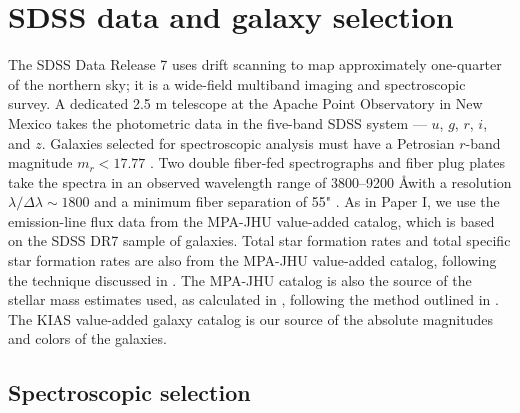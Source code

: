 %
%
\section[Data]{SDSS data and galaxy selection}

The SDSS Data Release 7 \citep[DR7;][]{Abazajian09} uses drift scanning to map 
approximately one-quarter of the northern sky; it is a wide-field multiband 
imaging and spectroscopic survey.  A dedicated 2.5 m telescope at the Apache 
Point Observatory in New Mexico \citep{Fukugita96, Gunn98} takes the photometric 
data in the five-band SDSS system --- $u$, $g$, $r$, $i$, and $z$.  Galaxies 
selected for spectroscopic analysis must have a Petrosian $r$-band magnitude 
$m_r < 17.77$ \citep{Lupton01, Strauss02}.  Two double fiber-fed spectrographs 
and fiber plug plates take the spectra in an observed wavelength range of 
3800--9200 \AA with a resolution $\lambda / \Delta \lambda \sim 1800$ and a 
minimum fiber separation of 55" \citep{Blanton03}.  As in Paper I, we use 
the emission-line flux data from the MPA-JHU value-added catalog, which is based 
on the SDSS DR7 sample of galaxies.  Total star formation rates and total 
specific star formation rates are also from the MPA-JHU value-added catalog, 
following the technique discussed in \cite{Brinchmann04}.  The MPA-JHU catalog 
is also the source of the stellar mass estimates used, as calculated in 
\cite{Tremonti04}, following the method outlined in \cite{Kauffmann03}.  The 
KIAS value-added galaxy catalog \citep{Choi10} is our source of the absolute 
magnitudes and colors of the galaxies.


\subsection{Spectroscopic selection}\label{sec:SDSS_limits}

